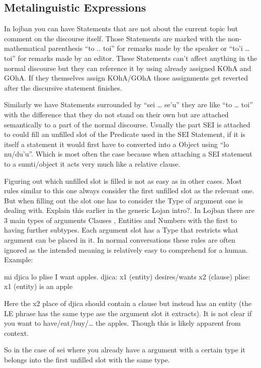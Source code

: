 \subsection{Metalinguistic Expressions}

In lojban you can have Statements that are not about the current topic but comment on the discourse itself. Those Statements are marked with the non-mathematical parenthesis “to .. toi” for remarks made by the speaker or “to’i … toi” for remarks made by an editor. These Statements can’t affect anything in the normal discourse but they can reference it by using already assigned KOhA and GOhA. If they themselves assign KOhA/GOhA those assignments get reverted after the discursive statement finishes.

Similarly we have Statements surrounded by “sei … se’u” they are like “to … toi” with the difference that they do not stand on their own but are attached semantically to a part of the normal discourse. Usually the part SEI is attached to could fill an unfilled slot of the Predicate used in the SEI Statement, if it is itself a statement it would first have to converted into a Object using “lo nu/du’u”. Which is most often the case because when attaching a SEI statement to a sumti/object it acts very much like a relative clause.

Figuring out which unfilled slot is filled is not as easy as in other cases. Most rules similar to this one always consider the first unfilled slot as the relevant one. But when filling out the slot one has to consider the Type of argument one is dealing with. Explain this earlier in the generic Lojan intro?. In Lojban there are 3 main types of arguments Clauses , Entities and Numbers with the first to having further subtypes. Each argument slot has a Type that restricts what argument can be placed in it. In normal conversations these rules are often ignored as the intended meaning is relatively easy to comprehend for a human.  Example:

\begin{center}
mi djica lo plise
I want apples.
djica: x1 (entity) desires/wants x2 (clause)
plise: x1 (entity) is an apple
\end{center}

Here the x2 place of djica should contain a clause but instead has an entity (the LE phrase has the same type ase the argument slot it extracts). It is not clear if you want to have/eat/buy/… the apples. Though this is likely apparent from context.

So in the case of sei where you already have a argument with a certain type it belongs into the first unfilled slot with the same type.


